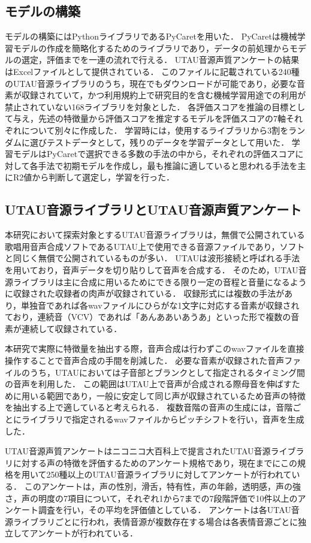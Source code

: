 \documentclass[a4j,8pt,twocolumn]{extarticle}
\begin{document}
\subsection{モデルの構築}
モデルの構築にはPythonライブラリであるPyCaretを用いた．
PyCaretは機械学習モデルの作成を簡略化するためのライブラリであり，データの前処理からモデルの選定，評価までを一連の流れで行える．
UTAU音源声質アンケートの結果はExcelファイルとして提供されている．
このファイルに記載されている240種のUTAU音源ライブラリのうち，現在でもダウンロードが可能であり，必要な音素が収録されていて，かつ利用規約上で研究目的を含む機械学習用途での利用が禁止されていない168ライブラリを対象とした．
各評価スコアを推論の目標として与え，先述の特徴量から評価スコアを推定するモデルを評価スコアの7軸それぞれについて別々に作成した．
学習時には，使用するライブラリから3割をランダムに選びテストデータとして，残りのデータを学習データとして用いた．
学習モデルはPyCaretで選択できる多数の手法の中から，それぞれの評価スコアに対して各手法で初期モデルを作成し，最も推論に適していると思われる手法を主にR2値から判断して選定し，学習を行った．

\subsection{UTAU音源ライブラリとUTAU音源声質アンケート}
本研究において探索対象とするUTAU音源ライブラリは，無償で公開されている歌唱用音声合成ソフトであるUTAU上で使用できる音源ファイルであり，ソフトと同じく無償で公開されているものが多い．
UTAUは波形接続と呼ばれる手法を用いており，音声データを切り貼りして音声を合成する．
そのため，UTAU音源ライブラリは主に合成に用いるためにできる限り一定の音程と音量になるように収録された収録者の肉声が収録されている．
収録形式には複数の手法があり，単独音であれば各wavファイルにひらがな1文字に対応する音素が収録されており，連続音（VCV）であれば「あんああいあうあ」\cite{tatsu3shiki}といった形で複数の音素が連続して収録されている．

本研究で実際に特徴量を抽出する際，音声合成は行わずこのwavファイルを直接操作することで音声合成の手間を削減した．
必要な音素が収録された音声ファイルのうち，UTAUにおいては子音部とブランクとして指定されるタイミング間の音声を利用した．
この範囲はUTAU上で音声が合成される際母音を伸ばすために用いる範囲であり，一般に安定して同じ声が収録されているため音声の特徴を抽出する上で適していると考えられる．
複数音階の音声の生成には，音階ごとにライブラリで指定されるwavファイルからピッチシフトを行い，音声を生成した．

UTAU音源声質アンケートはニコニコ大百科上で提言されたUTAU音源ライブラリに対する声の特徴を評価するためのアンケート規格であり，現在までにこの規格を用いて250種以上のUTAU音源ライブラリに対してアンケートが行われている．
このアンケートは，声の性別，滑舌，特有性，声の年齢，透明感，声の強さ，声の明度の7項目について，それぞれ1から7までの7段階評価で10件以上のアンケート調査を行い，その平均を評価値としている．
アンケートは各UTAU音源ライブラリごとに行われ，表情音源が複数存在する場合は各表情音源ごとに独立してアンケートが行われている．
\end{document}
